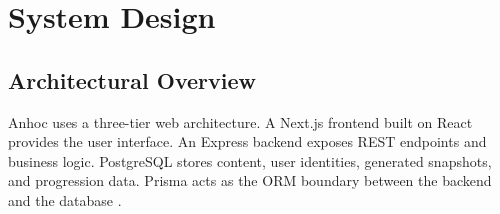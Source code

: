 \section{System Design}

\subsection{Architectural Overview}

Anhoc uses a three-tier web architecture. A Next.js frontend built on React provides the user interface. An Express backend exposes REST endpoints and business logic. PostgreSQL stores content, user identities, generated snapshots, and progression data. Prisma acts as the ORM boundary between the backend and the database \cite{nextjs-docs,react-docs,express-docs,prisma-docs,postgresql-docs}.

